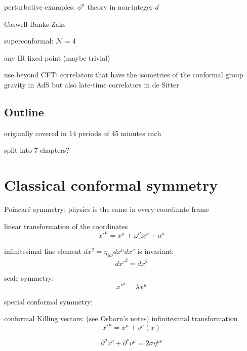 \documentclass[a4paper,12pt]{article}
\numberwithin{equation}{section}
\begin{document}
perturbative examples: $\phi^n$ theory in non-integer $d$

Caswell-Banks-Zaks

superconformal: $\mathcal{N} = 4$


any IR fixed point (maybe trivial)


use beyond CFT:
correlators that have the isometries of the conformal group
gravity in AdS
but also late-time correlators in de Sitter

\subsection{Outline}

originally covered in 14 periods of 45 minutes each

split into 7 chapters?


\section{Classical conformal symmetry}


Poincar\'e symmetry: physics is the same in every coordinate frame

linear transformation of the coordinates
\begin{equation}
	x'^\mu = x^\mu + \omega^\mu_{~\nu} x^\nu + a^\mu
\end{equation}


infinitesimal line element $dx^2 = \eta_{\mu\nu} dx^\mu dx^\nu$ is invariant:
\begin{equation}
	dx'^2 = dx^2
\end{equation}


scale symmetry:
\begin{equation}
	x'^\mu = \lambda x^\mu
\end{equation}




special conformal symmetry:


conformal Killing vectors:
(see Osborn's notes)
infinitesimal transformation
\begin{equation}
	x'^\mu = x^\mu + v^\mu(x)
\end{equation}

\begin{equation}
	\partial^\mu v^\nu + \partial^\nu v^\mu = 2 \sigma \eta^{\mu\nu}
\end{equation}
\end{document}
